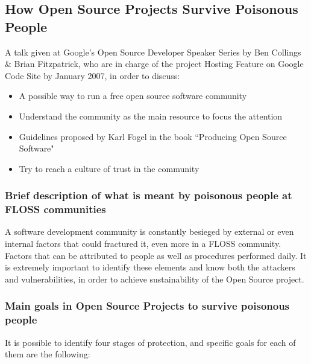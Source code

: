 \documentclass[11pt]{article} %
\begin{document}

\subsection{How Open Source Projects Survive Poisonous People}


A talk given at Google's Open Source Developer Speaker Series by Ben Collings \& Brian Fitzpatrick, who are in charge of the project Hosting Feature on Google Code Site by January 2007, in order to discuss:

\begin{itemize}
  \item A possible way to run a free open source software community
  \item Understand the community as the main resource to focus the attention
  \item Guidelines proposed by Karl Fogel in the book ``Producing Open Source Software" \cite{Fogel:2005kf}
  \item Try to reach a culture of trust in the community
\end{itemize}

\subsubsection{Brief description of what is meant by poisonous people at FLOSS communities}

A software development community is constantly besieged by external or even internal factors that could fractured it, even more in a FLOSS community. Factors that can be attributed to people as well as procedures performed daily. It is extremely important to identify these elements and know both the attackers and vulnerabilities, in order to achieve sustainability of the Open Source project.

\subsubsection{Main goals in Open Source Projects to survive poisonous people}

It is possible to identify four stages of protection, and specific goals for each of them are the following:
\end{document}
